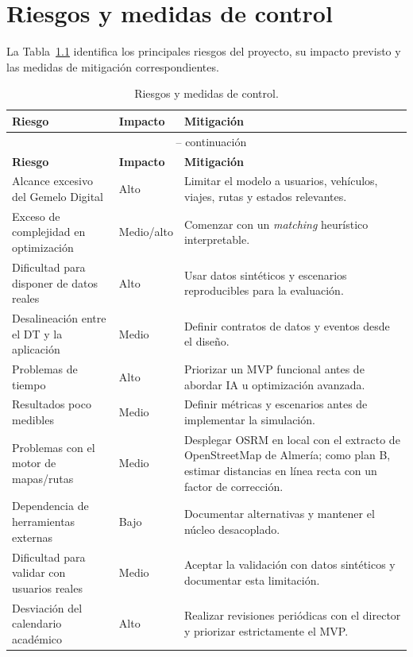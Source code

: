 
\chapter{Riesgos y medidas de control}
\label{ch:riesgos}

La Tabla~\ref{tab:riesgos-control} identifica los principales riesgos del proyecto, su impacto previsto y las medidas de mitigación correspondientes.

\begin{longtable}{p{4.2cm} p{2.3cm} p{8.14cm}}
  \caption{Riesgos y medidas de control.}
  \label{tab:riesgos-control}\\
  \hline
  \textbf{Riesgo} & \textbf{Impacto} & \textbf{Mitigación} \\
  \hline
  \endfirsthead
  \multicolumn{3}{c}{\tablename\ \thetable{} -- continuación}\\
  \hline
  \textbf{Riesgo} & \textbf{Impacto} & \textbf{Mitigación} \\
  \hline
  \endhead
  Alcance excesivo del Gemelo Digital & Alto & Limitar el modelo a usuarios, vehículos, viajes, rutas y estados relevantes. \\
  Exceso de complejidad en optimización & Medio/alto & Comenzar con un \textit{matching} heurístico interpretable. \\
  Dificultad para disponer de datos reales & Alto & Usar datos sintéticos y escenarios reproducibles para la evaluación. \\
  Desalineación entre el DT y la aplicación & Medio & Definir contratos de datos y eventos desde el diseño. \\
  Problemas de tiempo & Alto & Priorizar un MVP funcional antes de abordar IA u optimización avanzada. \\
  Resultados poco medibles & Medio & Definir métricas y escenarios antes de implementar la simulación. \\
  Problemas con el motor de mapas/rutas & Medio & Desplegar OSRM en local con el extracto de OpenStreetMap de Almería; como plan B, estimar distancias en línea recta con un factor de corrección. \\
  Dependencia de herramientas externas & Bajo & Documentar alternativas y mantener el núcleo desacoplado. \\
  Dificultad para validar con usuarios reales & Medio & Aceptar la validación con datos sintéticos y documentar esta limitación. \\
  Desviación del calendario académico & Alto & Realizar revisiones periódicas con el director y priorizar estrictamente el MVP. \\
  \hline
\end{longtable}
